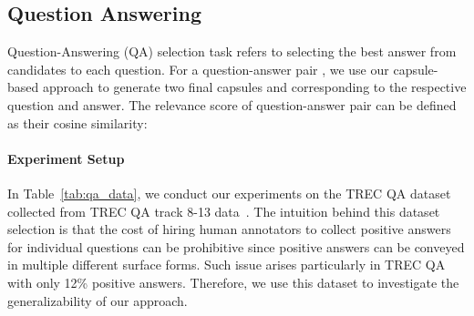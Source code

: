 \documentclass[11pt,a4paper]{article}
\newcommand{\1}{\boldsymbol{1}}
\begin{document}
\begin{table}[b]
	\centering
  \caption{Performance on EUR-Lex dataset with different routing process.}\label{tab:ablation}
  \vspace{-0.3cm}
\end{table}

\subsection{Question Answering}
Question-Answering (QA) selection task refers to selecting
the best answer from candidates to each question.
For a question-answer pair , we use our capsule-based approach to generate two final capsules  and  corresponding to the respective question and answer.
The relevance score of question-answer pair 
can be defined as their cosine similarity:

\paragraph{Experiment Setup}
In Table~\ref{tab:qa_data}, we conduct our experiments on the TREC QA dataset collected from TREC QA track 8-13 data~\cite{wang2007jeopardy}. The intuition behind this dataset selection is that the cost of hiring human annotators to collect positive answers for individual questions can be prohibitive since positive answers can be conveyed in multiple different surface forms. Such issue arises particularly in TREC QA with only 12\% positive answers. Therefore, we use this dataset to investigate the generalizability of our approach.
\end{document}
